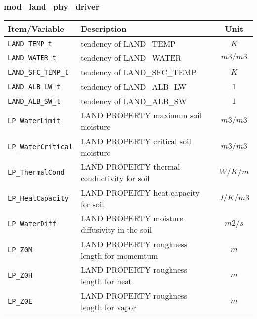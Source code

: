 \subsubsection{mod\_land\_phy\_driver}
 \begin{tabularx}{150mm}{|l|X|c|} \hline
 \rowcolor[gray]{0.9} Item/Variable & Description  & Unit \\\hline
  \verb|LAND_TEMP_t|      & tendency of LAND\_TEMP     & $K$ \\\hline
  \verb|LAND_WATER_t|     & tendency of LAND\_WATER    & $m3/m3$ \\\hline
  \verb|LAND_SFC_TEMP_t|  & tendency of LAND\_SFC\_TEMP & $K$  \\\hline
  \verb|LAND_ALB_LW_t|    & tendency of LAND\_ALB\_LW   & $1$  \\\hline
  \verb|LAND_ALB_SW_t|    & tendency of LAND\_ALB\_SW   & $1$  \\\hline
  \verb|LP_WaterLimit|    & LAND PROPERTY  maximum  soil moisture           & $m3/m3$  \\\hline
  \verb|LP_WaterCritical| & LAND PROPERTY  critical soil moisture           & $m3/m3$  \\\hline
  \verb|LP_ThermalCond|   & LAND PROPERTY  thermal conductivity for soil    & $W/K/m$  \\\hline
  \verb|LP_HeatCapacity|  & LAND PROPERTY  heat capacity for soil           & $J/K/m3$ \\\hline
  \verb|LP_WaterDiff|     & LAND PROPERTY  moisture diffusivity in the soil & $m2/s$   \\\hline
  \verb|LP_Z0M|           & LAND PROPERTY  roughness length for momemtum    & $m$      \\\hline
  \verb|LP_Z0H|           & LAND PROPERTY  roughness length for heat        & $m$      \\\hline
  \verb|LP_Z0E|           & LAND PROPERTY  roughness length for vapor       & $m$      \\\hline
 \end{tabularx}

